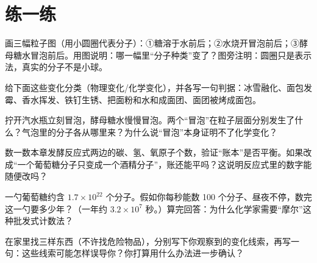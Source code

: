 \section*{练一练}

\begin{sikaoti}
\item 画三幅粒子图（用小圆圈代表分子）：①糖溶于水前后；②水烧开冒泡前后；③酵母糖水冒泡前后。用图说明：哪一幅里“分子种类”变了？图旁注明：圆圈只是表示法，真实的分子不是小球。
\item 给下面这些变化分类（物理变化/化学变化），并各写一句判据：冰雪融化、面包发霉、香水挥发、铁钉生锈、把面粉和水和成面团、面团被烤成面包。
\item 拧开汽水瓶立刻冒泡，酵母糖水慢慢冒泡。两个“冒泡”在粒子层面分别发生了什么？气泡里的分子各从哪里来？为什么说“冒泡”本身证明不了化学变化？
\item 数一数本章发酵反应式两边的碳、氢、氧原子个数，验证“账本”是否平衡。如果改成“一个葡萄糖分子只变成一个酒精分子”，账还能平吗？这说明反应式里的数字能随便改吗？
\item 一勺葡萄糖约含 $1.7\times 10^{22}$ 个分子。假如你每秒能数 100 个分子、昼夜不停，数完这一勺要多少年？（一年约 $3.2\times 10^{7}$ 秒。）算完回答：为什么化学家需要“摩尔”这种批发式计数法？
\item 在家里找三样东西（不许找危险物品），分别写下你观察到的变化线索，再写一句：这些线索可能怎样误导你？你打算用什么办法进一步确认？
\end{sikaoti}
